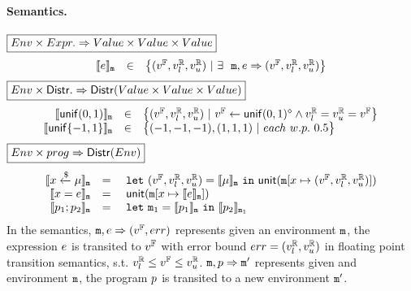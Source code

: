 \documentclass[a4paper,11pt]{article}
\begin{document}
\paragraph{Semantics.}
$\boxed{Env \times Expr. \Rightarrow Value \times Value \times Value }$
%
\[
	\begin{array}{rcl}
	\llbracket e \rrbracket_{\mathtt{m}}
	& \in &  
	\big\{(v^{\mathbb{F}}, v^{\mathbb{R}}_{l}, v^{\mathbb{R}}_{u}) ~|~
	\exists ~~  
	\mathtt{m},  
	e \Rightarrow (v^{\mathbb{F}}, v^{\mathbb{R}}_{l}, v^{\mathbb{R}}_{u})\big\}
	\end{array}
\]
%
$
\boxed{Env \times \mathsf{Distr}. \Rightarrow 
\mathsf{Distr}(Value \times Value \times Value )}
$
%
\[
	\begin{array}{rcl}
	\llbracket \mathsf{unif}(0, 1) \rrbracket_{\mathtt{m}}
	& \in & 
	\big\{
	(v^{\mathbb{F}}, v^{\mathbb{R}}_{l}, v^{\mathbb{R}}_{u}) ~|~
	v^{\mathbb{F}} \leftarrow \mathsf{unif}(0, 1)^{\diamond}
	\land v^{\mathbb{R}}_{l} = v^{\mathbb{R}}_{u} = v^{\mathbb{F}}
	\big\}\\
	\llbracket \mathsf{unif}\{-1, 1\} \rrbracket_{\mathtt{m}}
	& \in & 
	\big\{
	(-1, -1, -1), (1, 1, 1) ~|~
	each ~ w.p. ~ 0.5 
	\big\}\\	
	\end{array}
\]
%
$\boxed{Env \times prog \Rightarrow \mathsf{Distr}(Env)}$
\[
\begin{array}{rcl}
	\llbracket x \xleftarrow{\$} \mu \rrbracket_{\mathtt{m}}
	& = & 
	~\mathtt{let}~ (v^{\mathbb{F}}, v^{\mathbb{R}}_{l}, v^{\mathbb{R}}_{u}) = \llbracket \mu \rrbracket_{\mathtt{m}}
	~\mathtt{in}~ 
	\mathsf{unit}(\mathtt{m}[x \mapsto (v^{\mathbb{F}}, v^{\mathbb{R}}_{l}, v^{\mathbb{R}}_{u})])
	\\
	\llbracket x = e \rrbracket_{\mathtt{m}}
	& = &  
	~\mathsf{unit}(\mathtt{m}[x \mapsto \llbracket e \rrbracket_{\mathtt{m}}])
	\\
	\llbracket p_1; p_2 \rrbracket_{\mathtt{m}}
	& = &  ~\mathtt{let}~  \mathtt{m}_1 = 
	\llbracket p_1 \rrbracket_{\mathtt{m}} ~\mathtt{in}~
	\llbracket p_2 \rrbracket_{\mathtt{m}_1} 
\end{array}
\]
%
In the semantics, 
%
$\mathtt{m}, e \Rightarrow (v^{\mathbb{F}}, err)$ represents given an environment
%
$\mathtt{m}$, the expression $e$
%
is transited to $v^{\mathbb{F}}$ with error bound $err = (v^{\mathbb{R}}_{l}, v^{\mathbb{R}}_{u})$
in floating point transition semantics,
%
s.t. $v^{\mathbb{R}}_{l} \leq v^{\mathbb{F}} \leq v^{\mathbb{R}}_{u}$.
%
$\mathtt{m}, p \Rightarrow \mathtt{m}'$ represents given and environment $\mathtt{m}$,
%
the program $p$ is transited to a new environment $\mathtt{m}'$.
%
%
%
\end{document}
